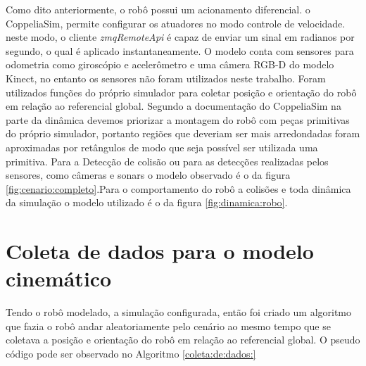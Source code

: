 Como dito anteriormente, o robô possui um acionamento diferencial.
o CoppeliaSim, permite configurar os atuadores no modo controle de
velocidade. neste modo, o cliente \textit{zmqRemoteApi} é capaz de enviar
um sinal em radianos por segundo, o qual é aplicado instantaneamente.
O modelo conta com sensores para odometria como giroscópio e acelerômetro
e uma câmera RGB-D do modelo Kinect, no entanto os sensores não foram
utilizados neste trabalho.
Foram utilizados funções do próprio simulador para coletar posição e 
orientação do robô em relação ao referencial global.
Segundo a documentação do CoppeliaSim na parte da dinâmica
devemos priorizar a montagem do robô com peças primitivas do próprio
simulador, portanto regiões que deveriam ser mais arredondadas foram
aproximadas por retângulos de modo que seja possível ser utilizada uma
primitiva. Para a Detecção de colisão ou para as detecções realizadas
pelos sensores,
como câmeras e sonars o modelo
observado é o da figura \ref{fig:cenario:completo}.Para o comportamento 
do robô a colisões e toda dinâmica da simulação o modelo utilizado
é o da figura \ref{fig:dinamica:robo}.


\section{Coleta de dados para o modelo cinemático}
Tendo o robô modelado, a simulação configurada, então foi criado
um algoritmo que fazia o robô andar aleatoriamente pelo cenário ao mesmo
tempo que se coletava a posição e orientação do robô em relação ao referencial
global. O pseudo código pode ser observado no Algoritmo \ref{coleta:de:dados:}

